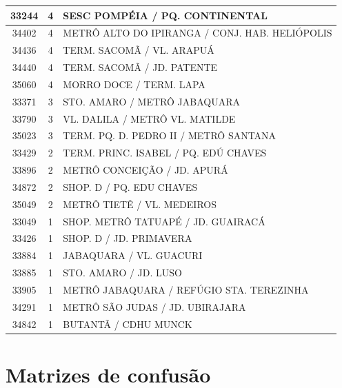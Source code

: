 \documentclass[
	12pt,				%
	oneside,			%
	a4paper,			%
	english,			%
	brazil				%
	]{abntex2ppgsi}
\begin{document}
\begin{apendicesenv}
\begin{longtable}{c|c|p{7cm}}
\hline
    33244 & 4     & SESC POMPÉIA / PQ. CONTINENTAL \\
\hline
    34402 & 4     & METRÔ ALTO DO IPIRANGA / CONJ. HAB. HELIÓPOLIS \\
\hline
    34436 & 4     & TERM. SACOMÃ / VL. ARAPUÁ \\
\hline
    34440 & 4     & TERM. SACOMÃ / JD. PATENTE \\
\hline
    35060 & 4     & MORRO DOCE / TERM. LAPA \\
\hline
    33371 & 3     & STO. AMARO / METRÔ JABAQUARA \\
\hline
    33790 & 3     & VL. DALILA / METRÔ VL. MATILDE \\
\hline
    35023 & 3     & TERM. PQ. D. PEDRO II / METRÔ SANTANA \\
\hline
    33429 & 2     & TERM. PRINC. ISABEL / PQ. EDÚ CHAVES \\
\hline
    33896 & 2     & METRÔ CONCEIÇÃO / JD. APURÁ \\
\hline
    34872 & 2     & SHOP. D / PQ. EDU CHAVES \\
\hline
    35049 & 2     & METRÔ TIETÊ / VL. MEDEIROS \\
\hline
    33049 & 1     & SHOP. METRÔ TATUAPÉ / JD. GUAIRACÁ \\
\hline
    33426 & 1     & SHOP. D / JD. PRIMAVERA \\
\hline
    33884 & 1     & JABAQUARA / VL. GUACURI \\
\hline
    33885 & 1     & STO. AMARO / JD. LUSO \\
\hline
    33905 & 1     & METRÔ JABAQUARA / REFÚGIO STA. TEREZINHA \\
\hline
    34291 & 1     & METRÔ SÃO JUDAS / JD. UBIRAJARA \\
\hline
    34842 & 1     & BUTANTÃ / CDHU MUNCK \\
\hline
\end{longtable}

\normalsize

\chapter{Matrizes de confusão}
\label{apendiceE}


\end{apendicesenv}
\end{document}

